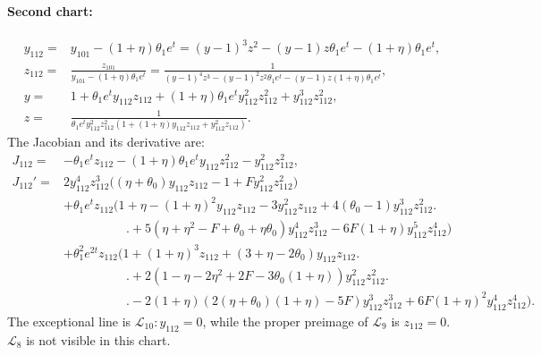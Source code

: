 \paragraph{Second chart:}
$$
\begin{aligned}
y_{112}=&y_{101}-(1 + \eta)\theta_1  e^t
= (y-1)^3z^2 - (y-1)z \theta_1 e^t -(1 + \eta)\theta_1  e^t
,
\\
z_{112}=&\frac{z_{101}}{y_{101}-(1 + \eta)\theta_1  e^t}
=\frac{1}{(y-1)^4z^3 - (y-1)^2z^2 \theta_1 e^t -(y-1)z(1 + \eta)\theta_1  e^t}
,
\\
y=&1 +  \theta_1 e^t y_{112} z_{112} + (1 + \eta)\theta_1  e^t y_{112}^2 z_{112}^2 + y_{112}^3 z_{112}^2,
\\
z=&\frac1{\theta_1  e^t y_{112}^2 z_{112}^2 (1 + (1 + \eta) y_{112} z_{112} + y_{112}^2 z_{112})}.
\end{aligned}
$$
The Jacobian and its derivative are:
$$
\begin{aligned}
J_{112} = &
-\theta_1 e^t z_{112} -(1+\eta) \theta_1 e^t y_{112} z_{112}^2-y_{112}^2 z_{112}^2,
\\
J_{112}' = &
2 y_{112}^4 z_{112}^3\big( (\eta+\theta_0) y_{112} z_{112} - 1 +   F y_{112}^2 z_{112}^2\big)
\\&
+\theta_1 e^t z_{112}\big(
1 + \eta - (1+\eta)^2y_{112} z_{112}  - 
 3 y_{112}^2 z_{112} + 4 (\theta_0-1) y_{112}^3 z_{112}^2 \big.
 \\&\qquad\qquad\quad
 \big.
 + 
 5 (\eta+ \eta^2 - F +\theta_0+ \eta \theta_0) y_{112}^4 z_{112}^3 
 - 6 F(1+ \eta) y_{112}^5 z_{112}^4
\big)
\\&
+\theta_1^2 e^{2t} z_{112}\big(
1 + (1+\eta)^3 z_{112} 
+ (3 +  \eta  - 2 \theta_0) y_{112} z_{112} 
\big.
\\&\qquad\qquad\quad
\big.
+ 2 (1 - \eta - 2 \eta^2  + 2 F  - 3 \theta_0(1+\eta)) y_{112}^2 z_{112}^2
\big.
\\&\qquad\qquad\quad
\big.
 - 2(1+\eta)( 2(\eta+\theta_0) (1+\eta) - 5 F ) y_{112}^3 z_{112}^3 + 
 6 F (1+\eta)^2y_{112}^4 z_{112}^4
\big)
.
\end{aligned}
$$
The exceptional line is $\mathcal{L}_{10} : y_{112}=0$, while the proper preimage of $\mathcal{L}_{9}$ is $z_{112}=0$. 
$\mathcal{L}_{8}$ is not visible in this chart.

